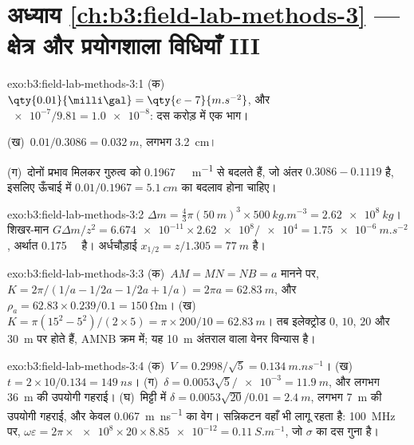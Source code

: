 \section*{अध्याय \ref{ch:b3:field-lab-methods-3} --- क्षेत्र और प्रयोगशाला विधियाँ III}

\begin{solution}{exo:b3:field-lab-methods-3:1}
(क)~$\qty{0.01}{\milli\gal} = \qty{e-7}{m.s^{-2}}$, और
$\num{e-7}/\num{9.81} = \num{1.0e-8}$: दस करोड़ में एक भाग।

(ख)~$0.01/0.3086 = \qty{0.032}{m}$, लगभग \qty{3.2}{cm}।

(ग)~दोनों प्रभाव मिलकर गुरुत्व को
\qty{0.1967}{\milli\gal.m^{-1}} से बदलते हैं, जो अंतर $0.3086 - 0.1119$ है, इसलिए
ऊँचाई में $0.01/0.1967 = \qty{5.1}{cm}$ का बदलाव होना चाहिए।
\end{solution}

\begin{solution}{exo:b3:field-lab-methods-3:2}
$\Delta m = \tfrac43\pi(\qty{50}{m})^3\times\qty{500}{kg.m^{-3}} =
\qty{2.62e8}{kg}$। शिखर-मान $G\Delta m/z^2 =
\num{6.674e-11}\times\num{2.62e8}/\num{e4} = \qty{1.75e-6}{m.s^{-2}}$,
अर्थात \qty{0.175}{\milli\gal} है। अर्धचौड़ाई $x_{1/2} = z/1.305 =
\qty{77}{m}$ है।
\end{solution}

\begin{solution}{exo:b3:field-lab-methods-3:3}
(क)~$AM = MN = NB = a$ मानने पर, $K = 2\pi/(1/a - 1/2a - 1/2a + 1/a) =
2\pi a = \qty{62.83}{m}$, और $\rho_a = 62.83\times0.239/0.1 =
\qty{150}{\ohm\metre}$। (ख)~$K = \pi(15^2 - 5^2)/(2\times5) = \pi\times
200/10 = \qty{62.83}{m}$। तब इलेक्ट्रोड $0$, $10$, $20$
और \qty{30}{m} पर होते हैं, AMNB क्रम में; यह
\qty{10}{m} अंतराल वाला वेनर विन्यास है।
\end{solution}

\begin{solution}{exo:b3:field-lab-methods-3:4}
(क)~$V = 0.2998/\sqrt5 = \qty{0.134}{m.ns^{-1}}$। (ख)~$t =
2\times10/0.134 = \qty{149}{ns}$। (ग)~$\delta = 0.0053\sqrt5/\num{e-3} =
\qty{11.9}{m}$, और लगभग \qty{36}{m} की उपयोगी गहराई। (घ)~मिट्टी में
$\delta = 0.0053\sqrt{20}/0.01 = \qty{2.4}{m}$, लगभग
\qty{7}{m} की उपयोगी गहराई, और केवल \qty{0.067}{m.ns^{-1}} का वेग।
सन्निकटन वहाँ भी लागू रहता है: \qty{100}{MHz} पर,
$\omega\varepsilon = 2\pi\times\num{e8}\times20\times\num{8.85e-12} =
\qty{0.11}{S.m^{-1}}$, जो $\sigma$ का दस गुना है।
\end{solution}

